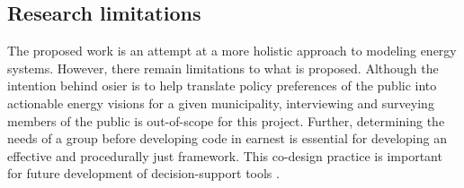 \subsection{Research limitations}

The proposed work is an attempt at a more holistic approach to modeling energy
systems. However, there remain limitations to what is proposed. Although the
intention behind \ac{osier} is to help translate policy preferences of the
public into actionable energy visions for a given municipality, interviewing and
surveying members of the public is out-of-scope for this project. Further,
determining the needs of a group before developing code in earnest is essential
for developing an effective and procedurally just framework. This co-design
practice is important for future development of decision-support tools
\cite{gonzalez_developing_2022,ryder_developing_2018}.


